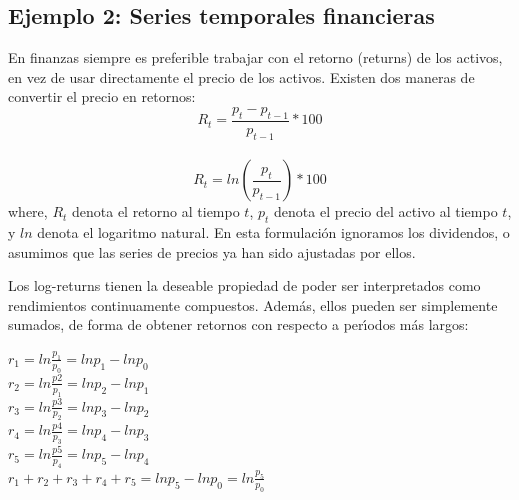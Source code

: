 \subsection{Ejemplo 2: Series temporales financieras}
En finanzas siempre es preferible trabajar con el retorno (returns) de los activos, en vez de usar directamente el precio de los activos. Existen dos maneras de convertir el precio en retornos:
\begin{equation*}
R_t = \frac{p_t - p_{t-1}}{p_{t-1}} *100%
\end{equation*}
\\
\begin{equation*}
R_t = ln\left(\frac{p_t}{p_{t-1}}\right)*100%
\end{equation*}
where, $R_t$ denota el retorno al tiempo $t$, $p_t$ denota el precio del activo al tiempo $t$, y $ln$ denota el logaritmo natural. En esta formulaci\'on ignoramos los dividendos, o asumimos que las series de precios ya han sido ajustadas por ellos.

Los log-returns tienen la deseable propiedad de poder ser interpretados como rendimientos continuamente compuestos. Adem\'as, ellos pueden ser simplemente sumados, de forma de obtener retornos con respecto a per\'\i{}odos m\'as largos:
\begin{center}
	$r_1 = ln \frac{p_1}{p_0} = ln p_1 - ln p_0$\\
	$r_2 = ln \frac{p2}{p_1} = ln p_2 - ln p_1$\\
	$r_3 = ln \frac{p3}{p_2} = ln p_3 - ln p_2$\\
	$r_4 = ln \frac{p4}{p_3} = ln p_4 - ln p_3$\\
	$r_5 = ln \frac{p5}{p_4} = ln p_5 - ln p_4$\\	
	\vspace{5mm}	     			      
	$r_1+r_2+r_3+r_4+r_5=ln p_5 - ln p_0    =  ln \frac{p_5}{p_0}$\\
\end{center}
